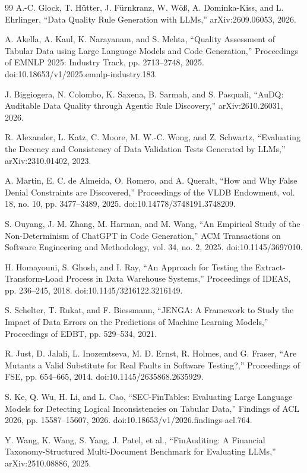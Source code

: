 \documentclass[11pt,a4paper]{article}
\begin{document}
\begin{thebibliography}{99}
 A.-C. Glock, T. H\"utter, J. F\"urnkranz, W. W\"o{\ss}, A. Dominka-Kiss, and L. Ehrlinger, ``Data Quality Rule Generation with LLMs,'' arXiv:2609.06053, 2026.

 A. Akella, A. Kaul, K. Narayanam, and S. Mehta, ``Quality Assessment of Tabular Data using Large Language Models and Code Generation,'' Proceedings of EMNLP 2025: Industry Track, pp. 2713--2748, 2025. doi:10.18653/v1/2025.emnlp-industry.183.

 J. Biggiogera, N. Colombo, K. Saxena, B. Sarmah, and S. Pasquali, ``AuDQ: Auditable Data Quality through Agentic Rule Discovery,'' arXiv:2610.26031, 2026.

 R. Alexander, L. Katz, C. Moore, M. W.-C. Wong, and Z. Schwartz, ``Evaluating the Decency and Consistency of Data Validation Tests Generated by LLMs,'' arXiv:2310.01402, 2023.

 A. Martin, E. C. de Almeida, O. Romero, and A. Queralt, ``How and Why False Denial Constraints are Discovered,'' Proceedings of the VLDB Endowment, vol. 18, no. 10, pp. 3477--3489, 2025. doi:10.14778/3748191.3748209.

 S. Ouyang, J. M. Zhang, M. Harman, and M. Wang, ``An Empirical Study of the Non-Determinism of ChatGPT in Code Generation,'' ACM Transactions on Software Engineering and Methodology, vol. 34, no. 2, 2025. doi:10.1145/3697010.

 H. Homayouni, S. Ghosh, and I. Ray, ``An Approach for Testing the Extract-Transform-Load Process in Data Warehouse Systems,'' Proceedings of IDEAS, pp. 236--245, 2018. doi:10.1145/3216122.3216149.

 S. Schelter, T. Rukat, and F. Biessmann, ``JENGA: A Framework to Study the Impact of Data Errors on the Predictions of Machine Learning Models,'' Proceedings of EDBT, pp. 529--534, 2021.

 R. Just, D. Jalali, L. Inozemtseva, M. D. Ernst, R. Holmes, and G. Fraser, ``Are Mutants a Valid Substitute for Real Faults in Software Testing?,'' Proceedings of FSE, pp. 654--665, 2014. doi:10.1145/2635868.2635929.

 S. Ke, Q. Wu, H. Li, and L. Cao, ``SEC-FinTables: Evaluating Large Language Models for Detecting Logical Inconsistencies on Tabular Data,'' Findings of ACL 2026, pp. 15587--15607, 2026. doi:10.18653/v1/2026.findings-acl.764.

 Y. Wang, K. Wang, S. Yang, J. Patel, et al., ``FinAuditing: A Financial Taxonomy-Structured Multi-Document Benchmark for Evaluating LLMs,'' arXiv:2510.08886, 2025.


\end{thebibliography}
\end{document}
